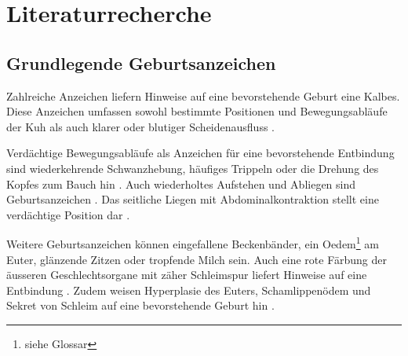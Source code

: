 \section{Literaturrecherche}
\subsection{Grundlegende Geburtsanzeichen}

Zahlreiche Anzeichen liefern Hinweise auf eine bevorstehende Geburt eine Kalbes. Diese Anzeichen umfassen sowohl bestimmte Positionen und Bewegungsabläufe der Kuh als auch klarer oder blutiger Scheidenausfluss \citep[S. 1]{Lange2017}.

Verdächtige Bewegungsabläufe als Anzeichen für eine bevorstehende Entbindung sind wiederkehrende Schwanzhebung, häufiges Trippeln oder die Drehung des Kopfes zum Bauch hin \citep[S. 1]{Lange2017}. Auch wiederholtes Aufstehen und Abliegen sind Geburtsanzeichen \citep[S. 4]{Saint-Dizier2015}. Das seitliche Liegen mit Abdominalkontraktion stellt eine verdächtige Position dar \citep[S. 1]{Lange2017}. 

Weitere Geburtsanzeichen können eingefallene Beckenbänder, ein \gls{Oedem}\footnote{\label{glossar-oedem}siehe Glossar} am Euter, glänzende Zitzen oder tropfende Milch sein. Auch eine rote Färbung der  äusseren Geschlechtsorgane mit zäher Schleimspur liefert Hinweise auf eine Entbindung \citep[S. 6]{Traulsen2013}. Zudem weisen \gls{Hyperplasie} des Euters, Schamlippenödem und \gls{Sekret} von Schleim auf eine bevorstehende Geburt hin \citep[S. 2]{Streyl2011}.


